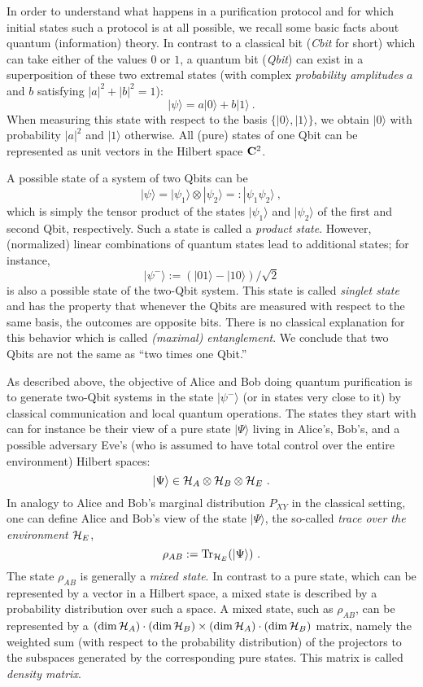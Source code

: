 \documentclass{article}
\newcommand{\Tr}{{\rm Tr}}
\newcommand{\HA}{{\cal H}_{{A}}}
\newcommand{\HB}{{\cal H}_{{B}}}
\newcommand{\HE}{{\cal H}_{{E}}}
\begin{document}
In order to understand what happens in  a purification protocol
and for which initial states such a protocol is at all possible, we 
recall some basic facts about quantum (information) theory. 
In contrast to a classical 
bit ({\em Cbit\/} for short) which can take either 
of the values $0$ or $1$, a quantum bit ({\em Qbit\/})
can exist in a superposition of these two extremal states
(with complex {\em probability amplitudes\/} $a$ and $b$ satisfying 
$|a|^2+|b|^2=1$):
\[
|\psi\rangle = a|0\rangle +b|1\rangle\ .
\]
When measuring this state with respect to the basis $\{|0\rangle,|1\rangle\}$,
we obtain $|0\rangle$ with probability $|a|^2$ and $|1\rangle$ otherwise.
All  (pure) states of one Qbit can  be represented 
as unit vectors in the Hilbert space ${\bf C}^2$.

A possible state of a system of two Qbits can be 
\[
|\psi\rangle= |\psi_1\rangle\otimes|\psi_2\rangle=:|\psi_1\psi_2\rangle\ ,
\]
which is simply the tensor product of the states 
$|\psi_1\rangle$ and $|\psi_2\rangle$ of the 
first and second Qbit, respectively. 
Such a state is called a {\em product state}.
However, (normalized) 
linear combinations of quantum states lead to additional states;
for instance,
\[
|\psi^{-}\rangle:=\left(|01\rangle -|10\rangle\right)/\sqrt{2}
\]
is also a  possible state of the two-Qbit system.
This state 
is called {\em singlet state\/} and 
has the property that whenever the Qbits are measured with 
respect to the same basis, the outcomes are opposite bits. 
There is no classical explanation for this behavior which
 is called 
{\em (maximal) entanglement}. We conclude that two Qbits are not the same 
as ``two times one Qbit.''


As described above, the objective of Alice and Bob  doing quantum 
purification is to generate two-Qbit systems in the state $|\psi^{-}\rangle$
(or in states very close to it) by classical communication and local 
quantum operations. The states they start with can for instance be their 
view of a pure state $|\Psi\rangle$ living in Alice's, Bob's, and a 
possible adversary Eve's (who is assumed to have total control over 
the entire environment) Hilbert spaces:
\[
|\Psi\rangle\in\HA\otimes \HB\otimes\HE\ .
\]
In analogy to Alice and Bob's marginal distribution $P_{XY}$ in the 
classical setting, one can define Alice and Bob's view of the state 
$|\Psi\rangle$, the so-called {\em trace over the environment $\HE$},
\[
\rho_{AB}:=\Tr_{\HE}(|\Psi\rangle)\ .
\]
The state $\rho_{AB}$
is generally a {\em mixed state}. In contrast to a pure state, which can be 
represented by a vector in a Hilbert space, a mixed state 
is described by a probability distribution over such a space.
A mixed state, such as $\rho_{AB}$, can be represented by a
$(\dim \HA)\cdot (\dim \HB)\times(\dim \HA)\cdot (\dim \HB)$ matrix, 
namely the weighted sum (with respect to the probability distribution)
of the projectors to the 
subspaces generated by the 
corresponding pure states. This matrix is 
called {\em density matrix}.
\end{document}
